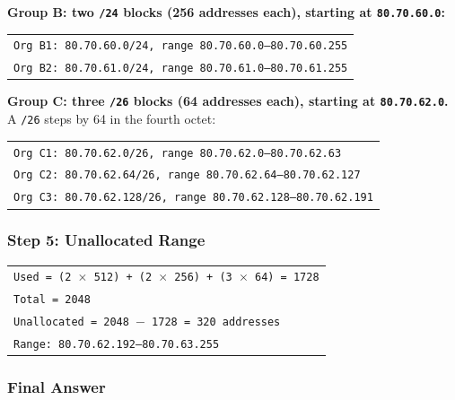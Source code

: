 \documentclass[11pt,a4paper]{article}
\begin{document}
\textbf{Group B: two \texttt{/24} blocks (256 addresses each), starting at
\texttt{80.70.60.0}:}

\begin{tabularx}{\textwidth}{@{}X@{}}
\texttt{Org B1: 80.70.60.0/24, range 80.70.60.0--80.70.60.255} \\
\texttt{Org B2: 80.70.61.0/24, range 80.70.61.0--80.70.61.255} \\
\end{tabularx}

\textbf{Group C: three \texttt{/26} blocks (64 addresses each), starting at
\texttt{80.70.62.0}.} A \texttt{/26} steps by 64 in the fourth octet:

\begin{tabularx}{\textwidth}{@{}X@{}}
\texttt{Org C1: 80.70.62.0/26, range 80.70.62.0--80.70.62.63} \\
\texttt{Org C2: 80.70.62.64/26, range 80.70.62.64--80.70.62.127} \\
\texttt{Org C3: 80.70.62.128/26, range 80.70.62.128--80.70.62.191} \\
\end{tabularx}

\subsubsection*{Step 5: Unallocated Range}

\begin{tabularx}{\textwidth}{@{}X@{}}
\texttt{Used = (2 $\times$ 512) + (2 $\times$ 256) + (3 $\times$ 64) = 1728} \\
\texttt{Total = 2048} \\
\texttt{Unallocated = 2048 $-$ 1728 = 320 addresses} \\
\texttt{Range: 80.70.62.192--80.70.63.255} \\
\end{tabularx}

\subsubsection*{Final Answer}
\end{document}
